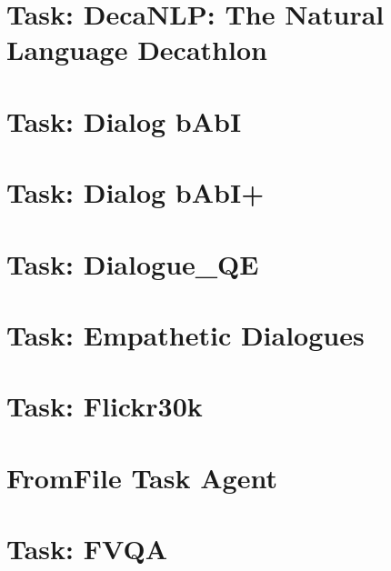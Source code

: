 \documentclass[twoside]{book}
\newcommand{\+}{\discretionary{\mbox{\scriptsize$\hookleftarrow$}}{}{}}
\begin{document}
\chapter{Task\+: Deca\+N\+LP\+: The Natural Language Decathlon}
\label{md_parlai_tasks_decanlp_README}

\chapter{Task\+: Dialog b\+AbI}
\label{md_parlai_tasks_dialog_babi_README}

\chapter{Task\+: Dialog b\+Ab\+I+}
\label{md_parlai_tasks_dialog_babi_plus_README}

\chapter{Task\+: Dialogue\+\_\+\+QE}
\label{md_parlai_tasks_dialogue_qe_README}

\chapter{Task\+: Empathetic Dialogues}
\label{md_parlai_tasks_empathetic_dialogues_README}

\chapter{Task\+: Flickr30k}
\label{md_parlai_tasks_flickr30k_README}

\chapter{From\+File Task Agent}
\label{md_parlai_tasks_fromfile_README}

\chapter{Task\+: F\+V\+QA}
\label{md_parlai_tasks_fvqa_README}

\end{document}
